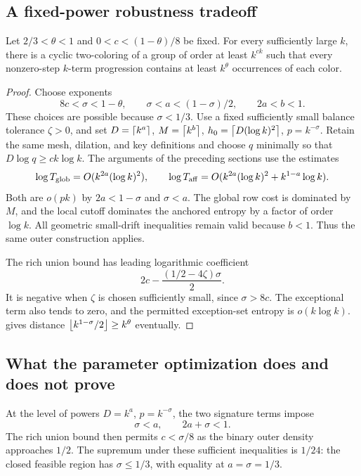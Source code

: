 \subsection{A fixed-power robustness tradeoff}

\begin{theorem}\label{thm:tradeoff}
Let \(2/3<\theta<1\) and \(0<c<(1-\theta)/8\) be fixed.
For every sufficiently large \(k\), there is a cyclic two-coloring
of a group of order at least \(k^{ck}\) such that every nonzero-step
\(k\)-term progression contains at least \(k^\theta\) occurrences
of each color.
\end{theorem}

\begin{proof}
Choose exponents
\[
 8c<\sigma<1-\theta,\qquad
 \sigma<a<(1-\sigma)/2,\qquad
 2a<b<1 .
\]
These choices are possible because \(\sigma<1/3\).
Use a fixed sufficiently small balance tolerance \(\zeta>0\),
and set \(D=\left\lceil k^a\right\rceil\), \(M=\left\lceil k^b\right\rceil\),
\(h_0=\left\lceil D(\log k)^2\right\rceil\), \(p=k^{-\sigma}\).
Retain the same mesh, dilation, and key definitions and choose
\(q\) minimally so that \(D\log q\ge ck\log k\).
The arguments of the preceding sections use the estimates
\[
 \log T_{\rm glob}=O(k^{2a}(\log k)^2),\qquad
 \log T_{\rm aff}
 =O(k^{2a}(\log k)^2+k^{1-a}\log k).
\]
Both are \(o(pk)\) by \(2a<1-\sigma\) and \(\sigma<a\).
The global row cost is dominated by \(M\), and the local cutoff
dominates the anchored entropy by a factor of order \(\log k\).
All geometric small-drift inequalities remain valid because \(b<1\).
Thus the same outer construction applies.

The rich union bound has leading logarithmic coefficient
\[
 2c-\frac{(1/2-4\zeta)\sigma}{2}.
\]
It is negative when \(\zeta\) is chosen sufficiently small, since
\(\sigma>8c\). The exceptional term also tends to zero, and
the permitted exception-set entropy is \(o(k\log k)\).
 gives distance
\(\left\lfloor k^{1-\sigma}/2\right\rfloor\ge k^\theta\) eventually.
\end{proof}

\subsection{What the parameter optimization does and does not prove}

At the level of powers \(D=k^a\), \(p=k^{-\sigma}\), the two
signature terms impose
\begin{equation}\label{eq:power-ledger}
 \sigma<a,\qquad 2a+\sigma<1.
\end{equation}
The rich union bound then permits \(c<\sigma/8\) as the binary
outer density approaches \(1/2\).
The supremum under these sufficient inequalities is \(1/24\):
the closed feasible region has \(\sigma\le1/3\), with equality at
\(a=\sigma=1/3\).

